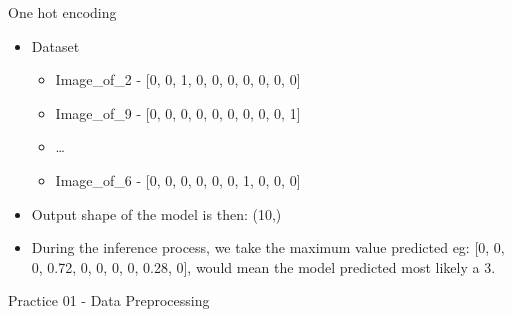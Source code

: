 \documentclass{beamer}
\begin{document}
\begin{frame}{One hot encoding}
    \begin{itemize}
    \item Dataset
    \begin{itemize}
        \item Image\_of\_2 - [0, 0, 1, 0, 0, 0, 0, 0, 0, 0]
        \item Image\_of\_9 - [0, 0, 0, 0, 0, 0, 0, 0, 0, 1]
        \item \ldots
        \item Image\_of\_6 - [0, 0, 0, 0, 0, 0, 1, 0, 0, 0]
    \end{itemize}

    \item Output shape of the model is then: (10,)

    \item During the inference process, we take the maximum value predicted eg: [0, 0, 0, 0.72, 0, 0, 0, 0, 0.28, 0], would mean the model predicted most likely a 3.
    
    \end{itemize}
\end{frame}


\begin{frame}{Practice 01 - Data Preprocessing}
    
\end{frame}
\end{document}
